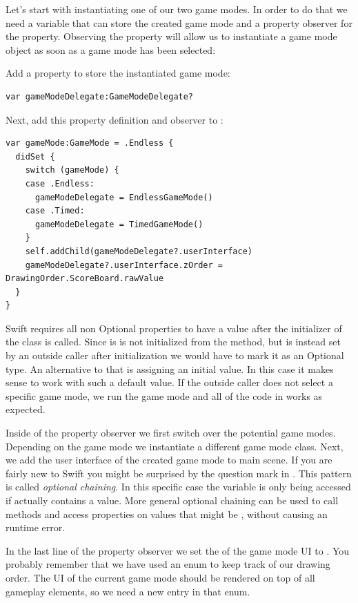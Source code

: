 Let's start with instantiating one of our two game modes. In order to do that we
need a variable that can store the created game mode and a property observer for
the  property. Observing the  property
will allow us to instantiate a game mode object as soon as a game mode has been
selected:
\begin{leftbar}
Add a property to store the instantiated game mode:
\begin{lstlisting}
var gameModeDelegate:GameModeDelegate?
\end{lstlisting}
Next, add this property definition and observer to :
\begin{lstlisting}
var gameMode:GameMode = .Endless {
  didSet {
    switch (gameMode) {
    case .Endless:
      gameModeDelegate = EndlessGameMode()
    case .Timed:
      gameModeDelegate = TimedGameMode()
    }
    self.addChild(gameModeDelegate?.userInterface)
    gameModeDelegate?.userInterface.zOrder = DrawingOrder.ScoreBoard.rawValue
  }
}
\end{lstlisting}
\end{leftbar}
Swift requires all non Optional properties to have a value after the
initializer of the class is called. Since  is is not
initialized from the  method, but is instead set by an outside caller after
 initialization we would have to mark it as an Optional type. An alternative to
 that is assigning an initial value. In this case it makes sense to work with
 such a default value. If the outside caller does not select a specific game
 mode, we run the  game mode and all of the code in
  works as expected.

Inside of the property observer we first switch over the potential game modes.
Depending on the game mode we instantiate a different game mode class. Next, we
add the user interface of the created game mode to main scene. If you are fairly
new to Swift you might be surprised by the question mark in
. This pattern is called
\textit{optional chaining}. In this specific case the 
variable is only being accessed if  actually
contains a value. More general optional chaining can be used to call methods and
access properties on values that might be , without causing an
runtime error.

In the last line of the property observer we set the  of the
game mode UI to . You probably
remember that we have used an enum to keep track of our drawing order. The UI of
the current game mode should be rendered on top of all gameplay elements, so we
need a new entry in that enum.

